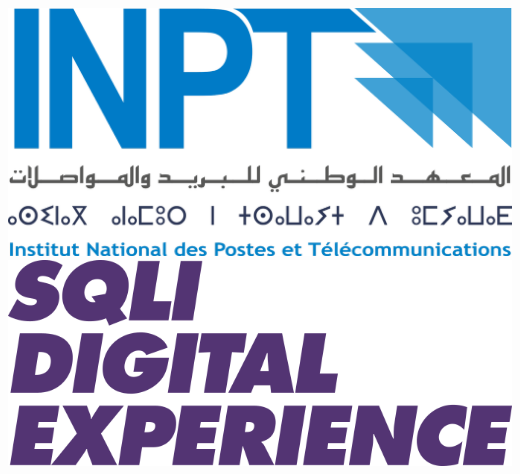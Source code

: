 
\thispagestyle{empty}
\includegraphics[scale=0.08]{Logos/Logo_INPT.png} 
         \hspace{11cm}  
         \includegraphics[scale=0.6]{Logos/SQLI_LOGO.png}
        

